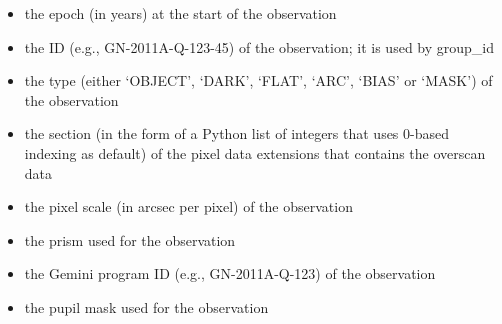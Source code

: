 \documentclass[letterpaper,10pt,english]{sphinxmanual}
\begin{document}
\begin{itemize}
\item {} 
the epoch (in years) at the start of the observation

\end{itemize}

\begin{itemize}
\item {} 
the ID (e.g., GN-2011A-Q-123-45) of the observation; it is used by group\_id

\end{itemize}

\begin{itemize}
\item {} 
the type (either `OBJECT', `DARK', `FLAT', `ARC', `BIAS' or `MASK') of the
observation

\end{itemize}

\begin{itemize}
\item {} 
the section (in the form of a Python list of integers that uses 0-based
indexing as default) of the pixel data extensions that contains the overscan
data

\end{itemize}

\begin{itemize}
\item {} 
the pixel scale (in arcsec per pixel) of the observation

\end{itemize}

\begin{itemize}
\item {} 
the prism used for the observation

\end{itemize}

\begin{itemize}
\item {} 
the Gemini program ID (e.g., GN-2011A-Q-123) of the observation

\end{itemize}

\begin{itemize}
\item {} 
the pupil mask used for the observation

\end{itemize}
\end{document}
